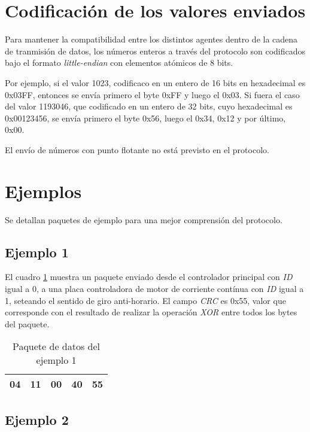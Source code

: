 \documentclass[a4paper,10pt]{article}
\begin{document}
\section{Codificaci\'on de los valores enviados}
\label{codificacion}

Para mantener la compatibilidad entre los distintos agentes dentro de la cadena de tranmisi\'on de datos,
los n\'umeros enteros a trav\'es del protocolo son codificados bajo el formato \emph{little-endian} con elementos at\'omicos de 8 bits.

Por ejemplo, si el valor 1023, codificaco en un entero de 16 bits en hexadecimal es 0x03FF,
entonces se env\'ia primero el byte 0xFF y luego el 0x03.
Si fuera el caso del valor 1193046, que codificado en un entero de 32 bits, cuyo hexadecimal es 0x00123456,
se env\'ia primero el byte 0x56, luego el 0x34, 0x12 y por \'ultimo, 0x00.

El env\'io de n\'umeros con punto flotante no est\'a previsto en el protocolo.

\section{Ejemplos}
\label{ejemplos}

Se detallan paquetes de ejemplo para una mejor comprensi\'on del protocolo.

\subsection{Ejemplo 1}
\label{ejemplo1}

El cuadro \ref{paquete_ejemplo1} muestra un paquete enviado desde el controlador principal con \emph{ID} igual a 0,
a una placa controladora de motor de corriente cont\'inua con \emph{ID} igual a 1, seteando el sentido de giro anti-horario.
El campo \emph{CRC} es 0x55, valor que corresponde con el resultado de realizar la operaci\'on \emph{XOR} entre
todos los bytes del paquete.

\begin{table}[h]
\begin{center}
\begin{tabular}{|c|c|c|c|c|}
\hline
04 & 11 & 00 & 40 & 55 \\
\hline
\end{tabular}
\caption{Paquete de datos del ejemplo 1}
\label{paquete_ejemplo1}
\end{center}
\end{table}

\subsection{Ejemplo 2}
\label{ejemplo2}
\end{document}
